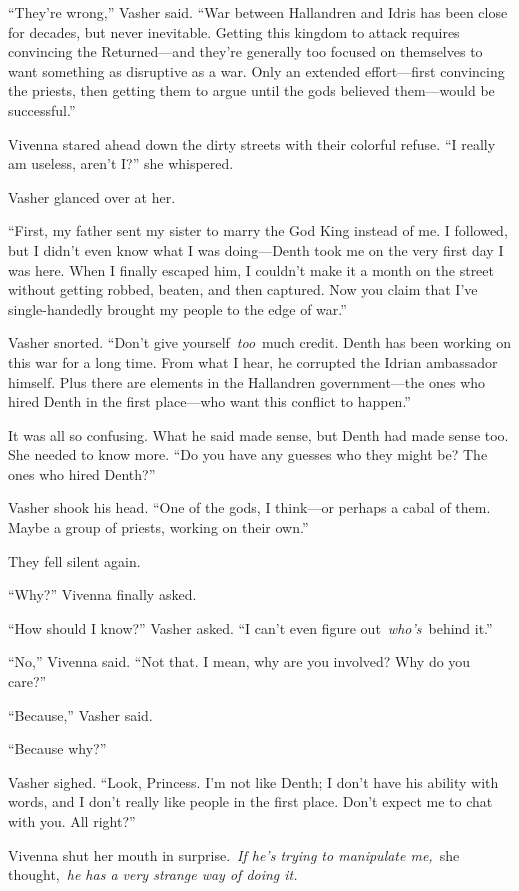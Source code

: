 “They’re wrong,” Vasher said. “War between Hallandren and Idris has been close for decades, but never inevitable. Getting this kingdom to attack requires convincing the Returned—and they’re generally too focused on themselves to want something as disruptive as a war. Only an extended effort—first convincing the priests, then getting them to argue until the gods believed them—would be successful.”

Vivenna stared ahead down the dirty streets with their colorful refuse. “I really am useless, aren’t I?” she whispered.

Vasher glanced over at her.

“First, my father sent my sister to marry the God King instead of me. I followed, but I didn’t even know what I was doing—Denth took me on the very first day I was here. When I finally escaped him, I couldn’t make it a month on the street without getting robbed, beaten, and then captured. Now you claim that I’ve single-handedly brought my people to the edge of war.”

Vasher snorted. “Don’t give yourself~\textit{too}~much credit. Denth has been working on this war for a long time. From what I hear, he corrupted the Idrian ambassador himself. Plus there are elements in the Hallandren government—the ones who hired Denth in the first place—who want this conflict to happen.”

It was all so confusing. What he said made sense, but Denth had made sense too. She needed to know more. “Do you have any guesses who they might be? The ones who hired Denth?”

Vasher shook his head. “One of the gods, I think—or perhaps a cabal of them. Maybe a group of priests, working on their own.”

They fell silent again.

“Why?” Vivenna finally asked.

“How should I know?” Vasher asked. “I can’t even figure out~\textit{who’s}~behind it.”

“No,” Vivenna said. “Not that. I mean, why are you involved? Why do you care?”

“Because,” Vasher said.

“Because why?”

Vasher sighed. “Look, Princess. I’m not like Denth; I don’t have his ability with words, and I don’t really like people in the first place. Don’t expect me to chat with you. All right?”

Vivenna shut her mouth in surprise.~\textit{If he’s trying to manipulate me,}~she thought,~\textit{he has a very strange way of doing it.}

